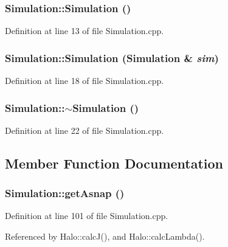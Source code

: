\subsubsection[{Simulation}]{\setlength{\rightskip}{0pt plus 5cm}Simulation::Simulation ()}\label{classSimulation_a5b224cc5b36bcc8eb29689aff223de41}


Definition at line 13 of file Simulation.cpp.

\subsubsection[{Simulation}]{\setlength{\rightskip}{0pt plus 5cm}Simulation::Simulation ({\bf Simulation} \& {\em sim})}\label{classSimulation_ac323b9845f7fe2ad84a61ad48bfec710}


Definition at line 18 of file Simulation.cpp.

\subsubsection[{$\sim$Simulation}]{\setlength{\rightskip}{0pt plus 5cm}Simulation::$\sim$Simulation ()}\label{classSimulation_a80fad3f57dfaf195a36f7bc49bc88279}


Definition at line 22 of file Simulation.cpp.



\subsection{Member Function Documentation}
\subsubsection[{getAsnap}]{ Simulation::getAsnap ()}\label{classSimulation_a03369208e6eeb8e4bacc778c1f23c299}


Definition at line 101 of file Simulation.cpp.



Referenced by Halo::calcJ(), and Halo::calcLambda().

